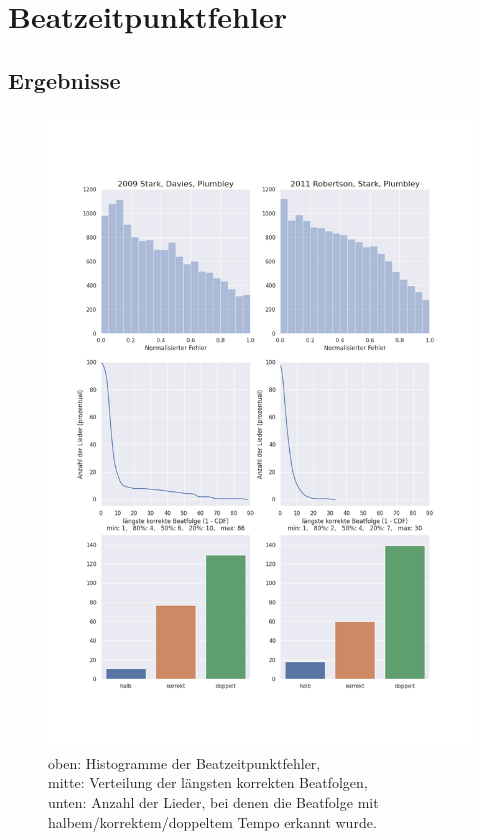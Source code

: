 \section{Beatzeitpunktfehler}
{
	\subsection{Ergebnisse}
	{
		\begin{figure}[h]
			\includegraphics[scale=0.5]{resources/beat_positions.png}
			\caption{
				oben: Histogramme der Beatzeitpunktfehler, \\
				mitte: Verteilung der längsten korrekten Beatfolgen, \\
				unten: Anzahl der Lieder, bei denen die Beatfolge mit halbem/korrektem/doppeltem Tempo erkannt wurde.
			}
			\label{fig:beaterror}
		\end{figure}

}}

